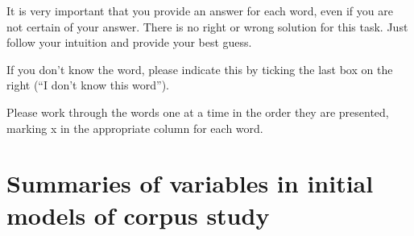 It is very important that you provide an answer for each word, even if you are not certain of your answer. There is no right or wrong solution for this task. Just follow your intuition and provide your best guess.

If you don’t know the word, please indicate this by ticking the last box on the right (``I don't know this word'').

Please work through the words one at a time in the order they are presented, marking x in the appropriate column for each word.



\chapter{Summaries of variables in initial models of corpus study}\label{App B: Summaries of variables in initial models of corpus study}
